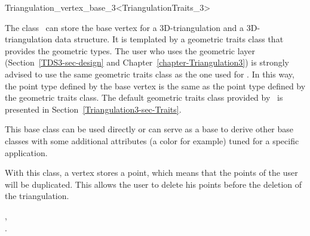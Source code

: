 

\begin{ccRefClass}{Triangulation_vertex_base_3<TriangulationTraits_3>}  %


\ccDefinition

The class \ccRefName\ can store the base vertex for a 3D-triangulation and a 3D-triangulation data structure. It is templated by a
geometric traits class  that provides the geometric
types. The user who uses the geometric layer
(Section~\ref{TDS3-sec-design} and
Chapter~\ref{chapter-Triangulation3}) is strongly advised to use the
same geometric traits class  as the one used for
.
In this way, the point type
defined by the base vertex is the same as the point type defined by
the geometric traits class. The default geometric traits class
provided by \cgal\ is presented in
Section~\ref{Triangulation3-sec-Traits}. 

This base class can be used directly or can serve as a base to derive
other base classes with some additional attributes (a color for
example) tuned for a specific application.

With this class, a vertex stores a point, which means that the points
of the user will be duplicated. This allows the user to delete his
points before the deletion of the triangulation.


\ccIsModel


\ccSeeAlso

,\\
.



\end{ccRefClass}


